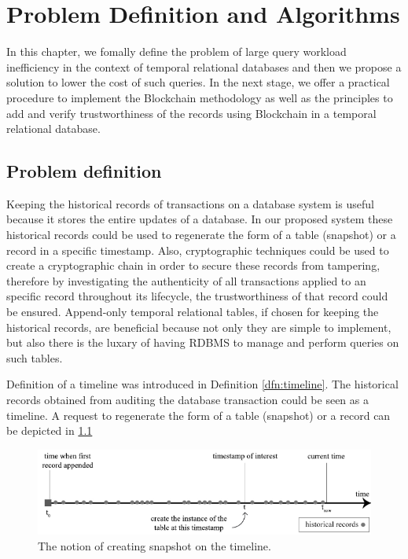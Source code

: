 \chapter{Problem Definition and Algorithms}

In this chapter, we fomally define the problem of large query workload inefficiency in the context of temporal relational databases and then we propose a solution to lower the cost of such queries. In the next stage, we offer a practical procedure to implement the Blockchain methodology as well as the principles to add and verify trustworthiness of the records using Blockchain in a temporal relational database.

\section{Problem definition}
Keeping the historical records of transactions on a database system is useful because it stores the entire updates of a database. In our proposed system these historical records could be used to regenerate the form of a table (snapshot) or a record in a specific timestamp. Also, cryptographic techniques could be used to create a cryptographic chain in order to secure these records from tampering, therefore by investigating the authenticity of all transactions applied to an specific record throughout its lifecycle, the trustworthiness of that record could be ensured. Append-only temporal relational tables, if chosen for keeping the historical records, are beneficial because not only they are simple to implement, but also there is the luxary of having RDBMS to manage and perform queries on such tables.

\begin{example}
	Definition of a timeline was introduced in Definition \ref{dfn:timeline}. The historical records obtained from auditing the database transaction could be seen as a timeline. A request to regenerate the form of a table (snapshot) or a record can be depicted in \ref{fig:snapshot_notion}
\label{example:timeline}
\end{example}

\begin{figure}
	\centering
	\includegraphics[width=\textwidth]{figs/snapshot_notion.pdf}
	\caption{The notion of creating snapshot on the timeline.}
	\label{fig:snapshot_notion}
\end{figure}


